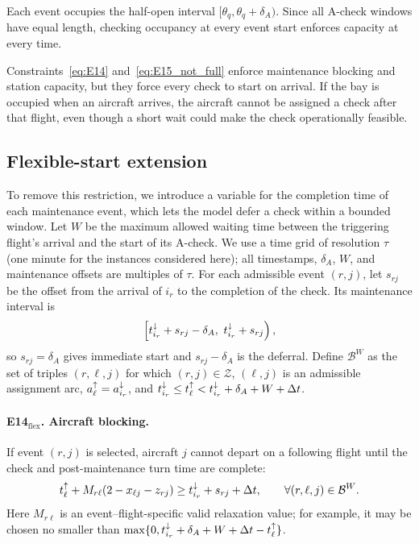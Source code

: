 Each event occupies the half-open interval
$[\theta_q,\theta_q+\delta_A)$. Since all A-check windows have equal length,
checking occupancy at every event start enforces capacity at every time.

Constraints~\eqref{eq:E14} and~\eqref{eq:E15_not_full} enforce maintenance
blocking and station capacity, but they force every check to start on arrival.
If the bay is occupied when an aircraft arrives, the aircraft cannot be
assigned a check after that flight, even though a short wait could make the
check operationally feasible.

\subsection{Flexible-start extension}
\label{subsec:flex_extension}

To remove this restriction, we introduce a variable for the completion time of
each maintenance event, which lets the model defer a check within a bounded
window. Let $W$ be the maximum allowed waiting time between the triggering
flight's arrival and the start of its A-check. We use a time grid of resolution $\tau$
(one minute for the instances considered here); all timestamps, $\delta_A$,
$W$, and maintenance offsets are multiples of $\tau$. For each admissible
event $(r,j)$, let $s_{rj}$ be the offset from the arrival of $i_r$ to the
completion of the check. Its maintenance interval is
\begin{equation}\label{eq:flex_window_for_E16}
\left[t^{\downarrow}_{i_r}+s_{rj}-\delta_A,\ t^{\downarrow}_{i_r}+s_{rj}\right),
\end{equation}
so $s_{rj}=\delta_A$ gives immediate start and $s_{rj}-\delta_A$ is the
deferral. Define $\mathcal{B}^{W}$ as the set of triples $(r,\ell,j)$ for
which $(r,j)\in\mathcal{Z}$, $(\ell,j)$ is an admissible assignment arc,
$a^{\uparrow}_{\ell}=a^{\downarrow}_{i_r}$, and
$t^{\downarrow}_{i_r}\leq t^{\uparrow}_{\ell}<t^{\downarrow}_{i_r}+\delta_A+W+\Delta t$.

\paragraph{E14$_{\mathrm{flex}}$. Aircraft blocking.}
If event $(r,j)$ is selected, aircraft $j$ cannot depart on a following flight
until the check and post-maintenance turn time are complete:
\begin{equation}\label{eq:E14_flex}
t^{\uparrow}_{\ell}+M_{r\ell}(2-x_{\ell j}-z_{rj})
\geq t^{\downarrow}_{i_r}+s_{rj}+\Delta t,
\qquad \forall (r,\ell,j)\in\mathcal{B}^{W}.
\end{equation}
Here $M_{r\ell}$ is an event--flight-specific valid relaxation value; for
example, it may be chosen no smaller than
$\max\{0,t^{\downarrow}_{i_r}+\delta_A+W+\Delta t-t^{\uparrow}_{\ell}\}$.

